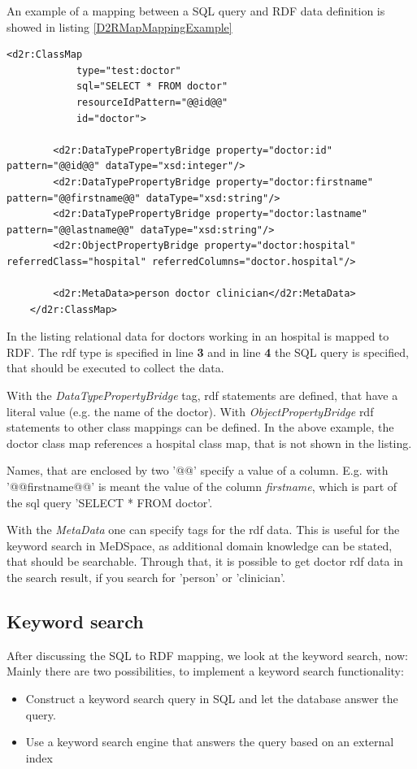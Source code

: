 An example of a mapping between a SQL query and RDF data definition is showed in listing \ref{D2RMapMappingExample}

\begin{lstlisting}[style=RdfCodeStyle, caption=Example of a MeDSpace D2rMap mapping, label=D2RMapMappingExample]
<d2r:ClassMap
			type="test:doctor"
			sql="SELECT * FROM doctor"
			resourceIdPattern="@@id@@"
			id="doctor">

		<d2r:DataTypePropertyBridge property="doctor:id" pattern="@@id@@" dataType="xsd:integer"/>
		<d2r:DataTypePropertyBridge property="doctor:firstname" pattern="@@firstname@@" dataType="xsd:string"/>
		<d2r:DataTypePropertyBridge property="doctor:lastname" pattern="@@lastname@@" dataType="xsd:string"/>
		<d2r:ObjectPropertyBridge property="doctor:hospital" referredClass="hospital" referredColumns="doctor.hospital"/>

		<d2r:MetaData>person doctor clinician</d2r:MetaData>
	</d2r:ClassMap>

\end{lstlisting}

In the listing relational data for doctors working in an hospital is mapped to RDF. The rdf type is specified in line \textbf{3} and in line \textbf{4} the SQL query is specified, that should be executed to collect the data. 

With the \emph{DataTypePropertyBridge} tag, rdf statements are defined, that have a literal value (e.g. the name of the doctor). 
With \emph{ObjectPropertyBridge} rdf statements to other class mappings can be defined. In the above example, the doctor class map references a hospital class map, that is not shown in the listing. 

Names, that are enclosed by two '@@' specify a value of a column. E.g. with '@@firstname@@' is meant the value of the column \emph{firstname}, which is part of the sql query 'SELECT * FROM doctor'.

With the \emph{MetaData} one can specify tags for the rdf data. This is useful for the keyword search in MeDSpace, as additional domain knowledge can be stated, that should be searchable. Through that, it is possible to get doctor rdf data in the search result, if you search for 'person' or 'clinician'. 

\subsection{Keyword search}

After discussing the SQL to RDF mapping, we look at the keyword search, now:
Mainly there are two possibilities, to implement a keyword search functionality:
\begin{itemize}
	\item {Construct a keyword search query in SQL and let the database answer the query.}
	
	\item {Use a keyword search engine that answers the query based on an external index}
\end{itemize}

